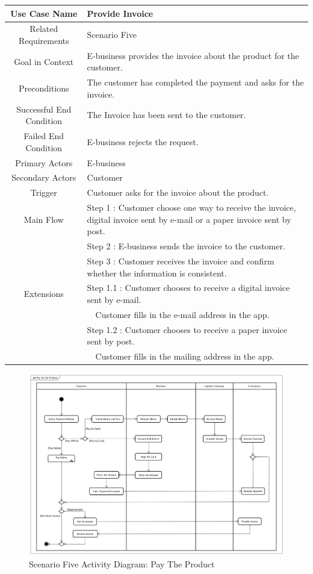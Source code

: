 \documentclass[12pt]{scrreprt}
\begin{document}
\begin{table}[H]
  \centering
  \begin{tabular}{| c | p{11cm} |}
    \hline
    Use Case Name & Provide Invoice\\
    \hline
    Related Requirements & Scenario Five\\
    \hline
    Goal in Context & E-business provides the invoice about the product for
    the customer.\\
    \hline
    Preconditions & The customer has completed the payment and asks for
    the invoice.\\
    \hline
    Successful End Condition & The Invoice has been sent to the customer.\\
    \hline
    Failed End Condition & E-business rejects the request.\\
    \hline
    Primary Actors & E-business\\
    \hline
    Secondary Actors & Customer\\
    \hline
    Trigger & Customer asks for the invoice about the product.\\
    \hline
    Main Flow & Step 1 : Customer choose one way to receive the invoice,
    digital invoice sent by e-mail or a paper invoice sent by post.\\
    & Step 2 : E-business sends the invoice to the customer.\\
    & Step 3 : Customer receives the invoice and confirm whether
    the information is consistent.\\
    \hline
    Extensions & Step 1.1 : Customer chooses to receive a digital invoice
    sent by e-mail.\\
    & \ \ Customer fills in the e-mail address in the app.\\
    & Step 1.2 : Customer chooses to receive a paper invoice sent by post.\\
    & \ \ Customer fills in the mailing address in the app.\\
    \hline
  \end{tabular}
\end{table}

\begin{figure}[H]
  \centering\includegraphics[width=5in]{DocumentRes/5PayTheProduct.png}
  \caption{Scenario Five Activity Diagram: Pay The Product}
\end{figure}
\end{document}
